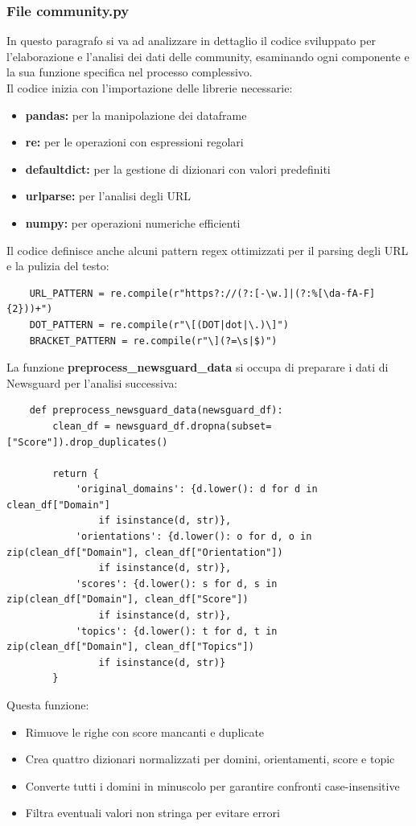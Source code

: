 \documentclass[12pt]{article}
\begin{document}
	\subsubsection{File community.py}
	In questo paragrafo si va ad analizzare in dettaglio il codice sviluppato per l'elaborazione e l'analisi dei dati delle community, esaminando ogni componente e la sua funzione specifica nel processo complessivo.\\
	Il codice inizia con l'importazione delle librerie necessarie:
	\begin{itemize}[label=]
		\item\textbf{pandas:} per la manipolazione dei dataframe
		\item \textbf{re:} per le operazioni con espressioni regolari
		\item \textbf{defaultdict:} per la gestione di dizionari con valori predefiniti
		\item \textbf{urlparse:} per l'analisi degli URL
		\item \textbf{numpy:} per operazioni numeriche efficienti
	\end{itemize}
	Il codice definisce anche alcuni pattern regex ottimizzati per il parsing degli URL e la pulizia del testo:
	\begin{lstlisting}
	URL_PATTERN = re.compile(r"https?://(?:[-\w.]|(?:%[\da-fA-F]{2}))+")
	DOT_PATTERN = re.compile(r"\[(DOT|dot|\.)\]")
	BRACKET_PATTERN = re.compile(r"\](?=\s|$)")
	\end{lstlisting}
	La funzione \textbf{preprocess\_newsguard\_data} si occupa di preparare i dati di Newsguard per l'analisi successiva:
	\begin{lstlisting}
	def preprocess_newsguard_data(newsguard_df):
		clean_df = newsguard_df.dropna(subset=["Score"]).drop_duplicates()
		
		return {
			'original_domains': {d.lower(): d for d in clean_df["Domain"] 
				if isinstance(d, str)},
			'orientations': {d.lower(): o for d, o in zip(clean_df["Domain"], clean_df["Orientation"]) 
				if isinstance(d, str)},
			'scores': {d.lower(): s for d, s in zip(clean_df["Domain"], clean_df["Score"])
				if isinstance(d, str)},
			'topics': {d.lower(): t for d, t in zip(clean_df["Domain"], clean_df["Topics"]) 
				if isinstance(d, str)}
		}
	\end{lstlisting}
	Questa funzione:
	\begin{itemize}[label=]
		\item Rimuove le righe con score mancanti e duplicate
		\item Crea quattro dizionari normalizzati per domini, orientamenti, score e topic
		\item Converte tutti i domini in minuscolo per garantire confronti case-insensitive
		\item Filtra eventuali valori non stringa per evitare errori
	\end{itemize}
\end{document}
